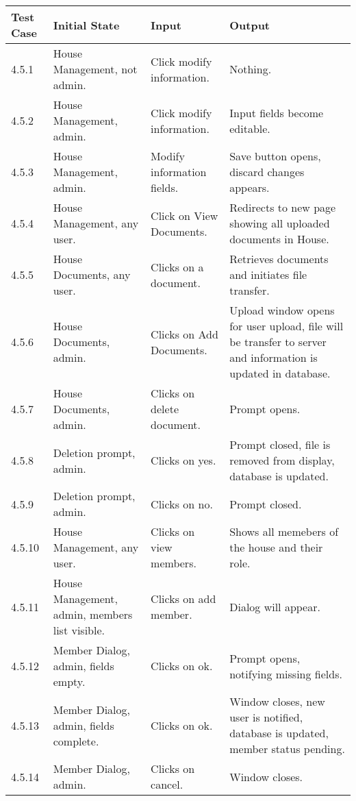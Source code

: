 \documentclass[12pt]{article}
\begin{document}
\begin{longtable}{|p{2cm}|p{3cm}|p{5cm}|p{5cm}|}
\hline
\textbf{Test Case}  & \textbf{Initial State} & \textbf{Input} & \textbf{Output} \\ \hline
4.5.1 & House Management, not admin. & Click modify information. & Nothing.\\ 
\hline
4.5.2 & House Management, admin. & Click modify information. & Input fields become editable. \\
\hline
4.5.3 & House Management, admin. & Modify information fields. & Save button opens, discard changes appears. \\
\hline
4.5.4 & House Management, any user. & Click on View Documents. & Redirects to new page showing all uploaded documents in House. \\
\hline
4.5.5 & House Documents, any user. & Clicks on a document. & Retrieves documents and initiates file transfer.\\
\hline
4.5.6 & House Documents, admin. & Clicks on Add Documents. & Upload window opens for user upload, file will be transfer to server and information is updated in database.\\
\hline
4.5.7 & House Documents, admin. & Clicks on delete document. & Prompt opens.\\
\hline
4.5.8 & Deletion prompt, admin. & Clicks on yes. & Prompt closed, file is removed from display, database is updated.\\
\hline
4.5.9 & Deletion prompt, admin. & Clicks on no. & Prompt closed.\\
\hline
4.5.10 & House Management, any user. & Clicks on view members. & Shows all memebers of the house and their role.\\
\hline
4.5.11 & House Management, admin, members list visible. & Clicks on add member. & Dialog will appear.\\
\hline
4.5.12 & Member Dialog, admin, fields empty. & Clicks on ok. & Prompt opens, notifying missing fields. \\
\hline
4.5.13 & Member Dialog, admin, fields complete. & Clicks on ok. & Window closes, new user is notified, database is updated, member status pending.\\
\hline
4.5.14 & Member Dialog, admin. & Clicks on cancel. & Window closes.\\
\hline
\end{longtable}

\end{document}
